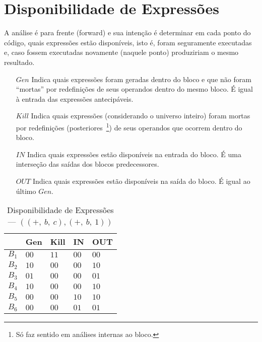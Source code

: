 \section{Disponibilidade de Express\~oes}

A an\'alise \'e para frente (\textsf{forward}) e sua inten\c{c}\~ao \'e determinar em cada ponto do c\'odigo, quais express\~oes est\~ao dispon\'iveis, isto \'e, foram seguramente executadas e, caso fossem executadas novamente (naquele ponto) produziriam o mesmo resultado.
\begin{itemize}
  \item[$Gen$] Indica quais express\~oes foram geradas dentro do bloco e que n\~ao foram ``mortas'' por redefini\c{c}\~oes de seus operandos dentro do mesmo bloco. {\color{red} \'E igual \`a entrada das express\~oes antecip\'aveis}.
  \item[$Kill$] Indica quais express\~oes (considerando o universo inteiro) foram mortas por redefini\c{c}\~oes (posteriores~\footnote{S\'o faz sentido em an\'alises internas ao bloco.}) de seus operandos que ocorrem dentro do bloco.
  \item[$IN$] Indica quais express\~oes est\~ao dispon\'iveis na entrada do bloco. \'E uma interse\c{c}\~ao das sa\'idas dos blocos predecessores.
  \item[$OUT$] Indica quais express\~oes est\~ao dispon\'iveis na sa\'ida do bloco. {\color{red} \'E igual ao \'ultimo $Gen$}.
\end{itemize}



\begin{table}[ht]
\centering
\begin{tabular}{l|l|l|l|l}
	& Gen & Kill & IN & OUT\\
\hline
$B_{1}$ &  $00$ & $11$ & $00$ & $00$\\
$B_{2}$ &  $10$ & $00$ & $00$ & $10$\\
$B_{3}$ &  $01$ & $00$ & $00$ & $01$\\
$B_{4}$ &  $10$ & $00$ & $00$ & $10$\\
$B_{5}$ &  $00$ & $00$ & $10$ & $10$\\
$B_{6}$ &  $00$ & $00$ & $01$ & $01$\\
\end{tabular}
\caption{Disponibilidade de Express\~oes --- $((+,\:b,\:c), (+,\:b,\:1))$}
\end{table}


